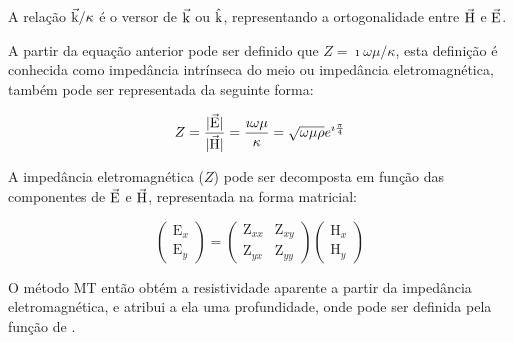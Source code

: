         \noindent A relação $\vec{\textrm{k}}/\kappa$ é o versor de $\vec{\textrm{k}}$ ou  $\hat{\textrm{k}}$, representando a ortogonalidade entre $\vec{\textrm{H}}$ e $\vec{\textrm{E}}$.
        
        A partir da equação anterior pode ser definido que $Z = \imath \omega \mu / \kappa$, esta definição é conhecida como impedância intrínseca do meio ou impedância eletromagnética, também pode ser representada da seguinte forma:
        
        \begin{equation}
            Z = \dfrac{|\vec{\textrm{E}}|}{|\vec{\textrm{H}}|} = \dfrac{\imath \omega \mu}{\kappa} = \sqrt{\omega \mu \rho} e^{\imath \frac{\pi}{4}}
        \end{equation}
        
        A impedância eletromagnética ($Z$) pode ser decomposta em função das componentes de $\vec{\textrm{E}}$ e $\vec{\textrm{H}}$, representada na forma matricial:
        
        \begin{equation}
            \label{tensor-impe}
            \left (\begin{array}{c}
                \textrm{E}_x\\
                \textrm{E}_y
                    \end{array}\right)
                =
            \left (\begin{array}{cc}
                \textrm{Z}_{xx} & \textrm{Z}_{xy}\\
                \textrm{Z}_{yx} & \textrm{Z}_{yy}
                    \end{array}\right)
            \left (\begin{array}{c}
                \textrm{H}_x\\
                \textrm{H}_y
                    \end{array}\right)
	    \end{equation}
	    
	    O método MT então obtém a resistividade aparente a partir da impedância eletromagnética, e atribui a ela uma profundidade, onde pode ser definida pela função de .          
